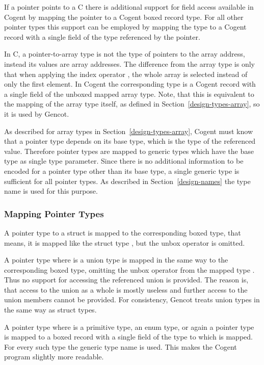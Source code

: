 If a pointer points to a C  there is additional support for field access available in Cogent by 
mapping the pointer to a Cogent boxed record type. For all other pointer types this support can be employed by
mapping the type to a Cogent record with a single field of the type referenced by the pointer.

In C, a pointer-to-array type is not the type of pointers to the array address, instead its values are array addresses.
The difference from the array type is only that when applying the index operator \code{[]}, the whole array is
selected instead of only the first element. In Cogent the corresponding type is a Cogent record with a single
field of the unboxed mapped array type. Note, that this is equivalent to the mapping of the array type itself, as defined
in Section~\ref{design-types-array}, so it is used by Gencot.

As described for array types in Section~\ref{design-types-array}, Cogent must know that a pointer type depends on 
its base type, which is the type of the referenced value. Therefore pointer types are mapped to generic types which
have the base type as single type parameter. Since there is no additional information to be encoded for a pointer
type other than its base type, a single generic type is sufficient for all pointer types. As described in 
Section~\ref{design-names} the type name  is used for this purpose.

\subsubsection{Mapping Pointer Types}

A pointer type  to a struct is mapped to the corresponding boxed type, 
that means, it is mapped like the struct type , but the unbox operator is omitted.

A pointer type  where  is a union type is mapped in the same way to the corresponding
boxed type, omitting the unbox operator from the mapped type . Thus no support for accessing
the referenced union is provided. The reason is, that access to the union as a whole is mostly useless
and further access to the union members cannot be provided. For consistency, Gencot treats union types
in the same way as struct types.

A pointer type  where  is a primitive type, an enum type, 
or again a pointer type is mapped to a boxed record with a single field  of the type  to which  is 
mapped. For every such type the generic type  name is used. This makes the 
Cogent program slightly more readable. 

